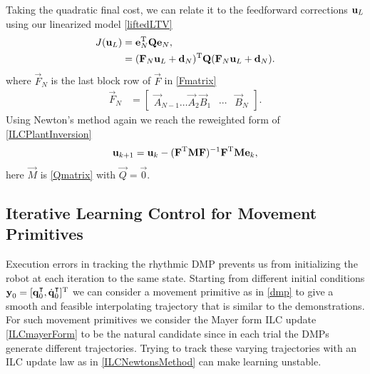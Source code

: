 Taking the quadratic final cost, we can relate it to the feedforward corrections $\boldsymbol{\mathrm{u}}_L$ using our linearized model \eqref{liftedLTV}
%
\begin{equation}
\begin{aligned}
J(\boldsymbol{\mathrm{u}}_L) &= \boldsymbol{\mathrm{e}}_{N}^{\mathrm{T}}\boldsymbol{\mathrm{Q}}\boldsymbol{\mathrm{e}}_{N}, \\
&= (\boldsymbol{\mathrm{F}}_N\boldsymbol{\mathrm{u}}_L + \boldsymbol{\mathrm{d}}_N)^{\mathrm{T}}\boldsymbol{\mathrm{Q}}(\boldsymbol{\mathrm{F}}_N\boldsymbol{\mathrm{u}}_L + \boldsymbol{\mathrm{d}}_N).
\end{aligned}
\label{finalCost}
\end{equation}
%
\noindent where $\vec{F}_N$ is the last block row of $\vec{F}$ in \eqref{Fmatrix}
%
\begin{equation*}
\begin{aligned}
 \vec{F}_N &= 
 \begin{bmatrix}
  \vec{A}_{N-1} \ldots \vec{A}_2 \vec{B}_1 & \cdots & \vec{B}_N 
 \end{bmatrix}.
\end{aligned}
\end{equation*}
%
\noindent Using Newton's method again we reach the reweighted form of \eqref{ILCPlantInversion}
%
\begin{equation}
\begin{aligned}
\boldsymbol{\mathrm{u}}_{k+1} &= \boldsymbol{\mathrm{u}}_k - (\boldsymbol{\mathrm{F}}^{\mathrm{T}}\boldsymbol{\mathrm{M}}\boldsymbol{\mathrm{F}})^{-1}\boldsymbol{\mathrm{F}}^{\mathrm{T}}\boldsymbol{\mathrm{M}}\boldsymbol{\mathrm{e}}_k,\\
\end{aligned}
\label{ILCmayerForm}
\end{equation}
%
\noindent here $\vec{M}$ is \eqref{Qmatrix} with $\vec{Q} = \vec{0}$.


\subsection{Iterative Learning Control for Movement Primitives}\label{ilcOnDMP} 

Execution errors in tracking the rhythmic DMP prevents us from initializing the robot at each iteration to the same state. Starting from different initial conditions $\boldsymbol{\mathrm{y}}_0 = [\boldsymbol{\mathrm{q}}^{\intercal}_0,\dot{\boldsymbol{\mathrm{q}}}^{\intercal}_0]^{\mathrm{T}}$ we can consider a movement primitive as in \eqref{dmp} to give a smooth and feasible interpolating trajectory that is similar to the demonstrations.
For such movement primitives we consider the Mayer form ILC update \eqref{ILCmayerForm} to be the natural candidate since in each trial the DMPs generate different trajectories. Trying to track these varying trajectories with an ILC update law as in \eqref{ILCNewtonsMethod} can make learning unstable.

